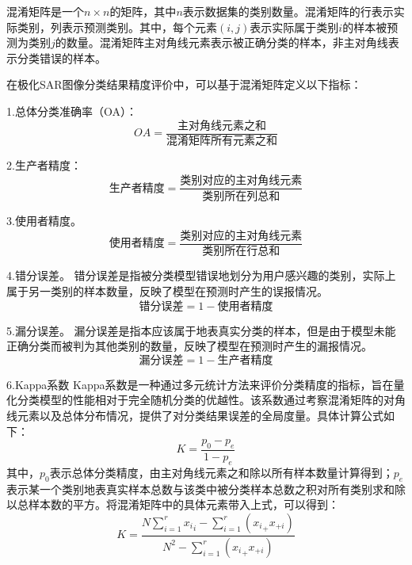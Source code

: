 混淆矩阵是一个$n \times n$的矩阵，其中$n$表示数据集的类别数量。混淆矩阵的行表示实际类别，列表示预测类别。其中，每个元素$(i, j)$表示实际属于类别$i$的样本被预测为类别$j$的数量。混淆矩阵主对角线元素表示被正确分类的样本，非主对角线表示分类错误的样本。

在极化SAR图像分类结果精度评价中，可以基于混淆矩阵定义以下指标：

1.总体分类准确率（OA）：
\begin{equation}
  OA=\frac{\mbox{主对角线元素之和}}{\mbox{混淆矩阵所有元素之和}}
\end{equation}

2.生产者精度：
\begin{equation}
  \mbox{生产者精度}=\frac{\mbox{类别对应的主对角线元素}}{\mbox{类别所在列总和}}
\end{equation}

3.使用者精度。
\begin{equation}
  \mbox{使用者精度}=\frac{\mbox{类别对应的主对角线元素}}{\mbox{类别所在行总和}}
\end{equation}

4.错分误差。
错分误差是指被分类模型错误地划分为用户感兴趣的类别，实际上属于另一类别的样本数量，反映了模型在预测时产生的误报情况。
\begin{equation}
  \mbox{错分误差}=1-\mbox{使用者精度}
\end{equation}

5.漏分误差。
漏分误差是指本应该属于地表真实分类的样本，但是由于模型未能正确分类而被判为其他类别的数量，反映了模型在预测时产生的漏报情况。
\begin{equation}
  \mbox{漏分误差}=1-\mbox{生产者精度}
\end{equation}

6.Kappa系数
Kappa系数是一种通过多元统计方法来评价分类精度的指标，旨在量化分类模型的性能相对于完全随机分类的优越性。该系数通过考察混淆矩阵的对角线元素以及总体分布情况，提供了对分类结果误差的全局度量。具体计算公式如下：
\begin{equation}
  K=\frac{p_0-p_e}{1-p_e}
\end{equation}
其中，$p_0$表示总体分类精度，由主对角线元素之和除以所有样本数量计算得到；$p_e$表示某一个类别地表真实样本总数与该类中被分类样本总数之积对所有类别求和除以总样本数的平方。将混淆矩阵中的具体元素带入上式，可以得到：
\begin{equation}
  K=\frac{N\sum_{i=1}^{r}{{x_i}_i}-\sum_{i=1}^{r}{\left( {x_i}_+x_{+i} \right)}}{N^2-\sum_{i=1}^{r}{\left( {x_i}_+x_{+i} \right)}}
\end{equation}

